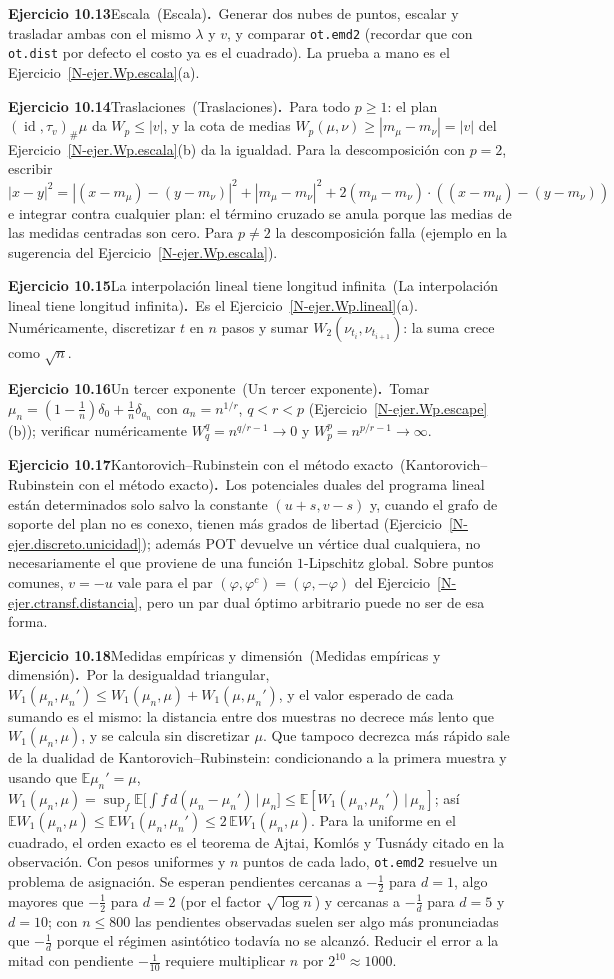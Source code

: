 \documentclass[11pt,a4paper]{amsart}
\newcommand{\id}{\operatorname{id}}
\newcommand{\E}{{\mathbb E}}
\theoremstyle{remark}
\theoremstyle{definition}
\numberwithin{subsection}{section}
\numberwithin{equation}{section}
\newcommand{\ejlabel}[2]{\par\medskip\noindent\textbf{Ejercicio #1}\ifx\relax#2\relax\else\ (#2)\fi\textbf{.}\ }
\begin{document}
\ejlabel{10.13}{Escala}Generar dos nubes de puntos, escalar y trasladar ambas con el mismo $\lambda$ y $v$, y comparar \texttt{ot.emd2} (recordar que con \texttt{ot.dist} por defecto el costo ya es el cuadrado). La prueba a mano es el Ejercicio~\ref{N-ejer.Wp.escala}(a).

\ejlabel{10.14}{Traslaciones}Para todo $p\ge1$: el plan $(\id,\tau_v)_\#\mu$ da $W_p\le|v|$, y la cota de medias $W_p(\mu,\nu)\ge|m_\mu-m_\nu|=|v|$ del Ejercicio~\ref{N-ejer.Wp.escala}(b) da la igualdad. Para la descomposición con $p=2$, escribir $|x-y|^2=|(x-m_\mu)-(y-m_\nu)|^2+|m_\mu-m_\nu|^2+2(m_\mu-m_\nu)\cdot((x-m_\mu)-(y-m_\nu))$ e integrar contra cualquier plan: el término cruzado se anula porque las medias de las medidas centradas son cero. Para $p\ne2$ la descomposición falla (ejemplo en la sugerencia del Ejercicio~\ref{N-ejer.Wp.escala}).

\ejlabel{10.15}{La interpolación lineal tiene longitud infinita}Es el Ejercicio~\ref{N-ejer.Wp.lineal}(a). Numéricamente, discretizar $t$ en $n$ pasos y sumar $W_2(\nu_{t_i},\nu_{t_{i+1}})$: la suma crece como $\sqrt n$.

\ejlabel{10.16}{Un tercer exponente}Tomar $\mu_n=(1-\frac1n)\delta_0+\frac1n\delta_{a_n}$ con $a_n=n^{1/r}$, $q<r<p$ (Ejercicio~\ref{N-ejer.Wp.escape}(b)); verificar numéricamente $W_q^q=n^{q/r-1}\to0$ y $W_p^p=n^{p/r-1}\to\infty$.

\ejlabel{10.17}{Kantorovich--Rubinstein con el método exacto}Los potenciales duales del programa lineal están determinados solo salvo la constante $(u+s,v-s)$ y, cuando el grafo de soporte del plan no es conexo, tienen más grados de libertad (Ejercicio~\ref{N-ejer.discreto.unicidad}); además POT devuelve un vértice dual cualquiera, no necesariamente el que proviene de una función $1$-Lipschitz global. Sobre puntos comunes, $v=-u$ vale para el par $(\varphi,\varphi^c)=(\varphi,-\varphi)$ del Ejercicio~\ref{N-ejer.ctransf.distancia}, pero un par dual óptimo arbitrario puede no ser de esa forma.

\ejlabel{10.18}{Medidas empíricas y dimensión}Por la desigualdad triangular, $W_1(\mu_n,\mu_n')\le W_1(\mu_n,\mu)+W_1(\mu,\mu_n')$, y el valor esperado de cada sumando es el mismo: la distancia entre dos muestras no decrece más lento que $W_1(\mu_n,\mu)$, y se calcula sin discretizar $\mu$. Que tampoco decrezca más rápido sale de la dualidad de Kantorovich--Rubinstein: condicionando a la primera muestra y usando que $\E\mu_n'=\mu$, $W_1(\mu_n,\mu)=\sup_f\E\bigl[\int f\,d(\mu_n-\mu_n')\,\big|\,\mu_n\bigr]\le\E[W_1(\mu_n,\mu_n')\,|\,\mu_n]$; así $\E W_1(\mu_n,\mu)\le\E W_1(\mu_n,\mu_n')\le2\,\E W_1(\mu_n,\mu)$. Para la uniforme en el cuadrado, el orden exacto es el teorema de Ajtai, Komlós y Tusnády citado en la observación. Con pesos uniformes y $n$ puntos de cada lado, \texttt{ot.emd2} resuelve un problema de asignación. Se esperan pendientes cercanas a $-\frac12$ para $d=1$, algo mayores que $-\frac12$ para $d=2$ (por el factor $\sqrt{\log n}$) y cercanas a $-\frac1d$ para $d=5$ y $d=10$; con $n\le800$ las pendientes observadas suelen ser algo más pronunciadas que $-\frac1d$ porque el régimen asintótico todavía no se alcanzó. Reducir el error a la mitad con pendiente $-\frac1{10}$ requiere multiplicar $n$ por $2^{10}\approx1000$.
\end{document}
